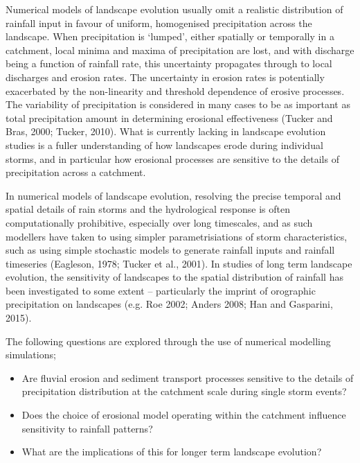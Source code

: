 Numerical models of landscape evolution usually omit a realistic distribution of rainfall input in favour of uniform, homogenised precipitation across the landscape. When precipitation is `lumped', either spatially or temporally in a catchment, local minima and maxima of precipitation are lost, and with discharge being a function of rainfall rate, this uncertainty propagates through to local discharges and erosion rates. The uncertainty in erosion rates is potentially exacerbated by the non-linearity and threshold dependence of erosive processes. The variability of precipitation is considered in many cases to be as important as total precipitation amount in determining erosional effectiveness (Tucker and Bras, 2000; Tucker, 2010). What is currently lacking in landscape evolution studies is a fuller understanding of how landscapes erode during individual storms, and in particular how erosional processes are sensitive to the details of precipitation across a catchment. 

In numerical models of landscape evolution, resolving the precise temporal and spatial details of rain storms and the hydrological response is often computationally prohibitive, especially over long timescales, and as such modellers have taken to using simpler parametrisiations of storm characteristics, such as using simple stochastic models to generate rainfall inputs and rainfall timeseries (Eagleson, 1978; Tucker et al., 2001). In studies of long term landscape evolution, the sensitivity of landscapes to the spatial distribution of rainfall has been investigated to some extent -- particularly the imprint of orographic precipitation on landscapes (e.g. Roe 2002; Anders 2008; Han and Gasparini, 2015). 

The following questions are explored through the use of numerical modelling simulations;

\begin{itemize}
\item Are fluvial erosion and sediment transport processes sensitive to the details of precipitation distribution at the catchment scale during single storm events?
\item Does the choice of erosional model operating within the catchment influence sensitivity to rainfall patterns? 
\item What are the implications of this for longer term landscape evolution? 
\end{itemize}


